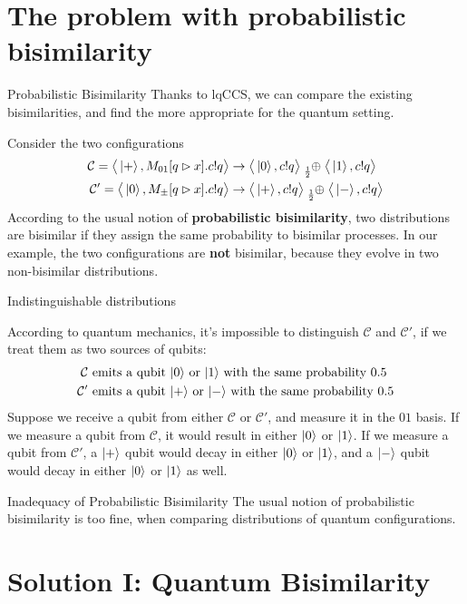 \documentclass{beamer}
\newcommand{\kz}{\ket{0}}
\newcommand{\ko}{\ket{1}}
\newcommand{\kpl}{\ket{+}}
\newcommand{\km}{\ket{-}}
\newcommand{\psum}[1]{\tensor[_{#1}]{\oplus}{}}
\newcommand{\conf}{\mathcal{C}}
\newcommand{\confw}[1]{\big\langle#1\big\rangle}
\begin{document}
\section{The problem with probabilistic bisimilarity}
\begin{frame}{Probabilistic Bisimilarity}
Thanks to lqCCS, we can compare the existing bisimilarities, and find the more appropriate for the quantum setting. 
\pause


Consider the two configurations 
\begin{align*}
\conf = \confw{\kpl, M_{01}[q \rhd x].c!q} &\rightarrow \confw{\kz, c!q} \psum{\frac{1}{2}} \confw{\ko, c!q} \\
\conf' = \confw{\kz, M_{\pm}[q \rhd x].c!q} &\rightarrow \confw{\kpl, c!q} \psum{\frac{1}{2}} \confw{\km, c!q}
\end{align*}
\pause
According to the usual notion of \textbf{probabilistic bisimilarity}, two distributions are bisimilar if they assign the same probability to bisimilar processes. In our example, the two configurations  are \textbf{not} bisimilar, because they evolve in two non-bisimilar distributions.

\end{frame}

\begin{frame}{Indistinguishable distributions}

According to quantum mechanics, it's impossible to distinguish $\conf$ and $\conf'$, if we treat them as two sources of qubits:
\begin{align*}
\conf &\text{ emits a qubit $\kz$ or $\ko$ with the same probability $0.5$}\\
\conf' &\text{ emits a qubit $\kpl$ or $\km$ with the same probability $0.5$}
\end{align*}
Suppose we receive a qubit from either $\conf$ or $\conf'$, and measure it in the $01$ basis. If we measure a qubit from $\conf$, it would result in either $\kz$ or $\ko$. If we measure a qubit from $\conf'$, a $\kpl$ qubit would decay in either $\kz$ or $\ko$, and a $\km$ qubit would decay in either $\kz$ or $\ko$ as well.

\pause
\begin{block}{Inadequacy of Probabilistic Bisimilarity}
The usual notion of probabilistic bisimilarity is too fine, when comparing distributions of quantum configurations.
\end{block}
\end{frame}

\section{Solution I: Quantum Bisimilarity}
\end{document}
